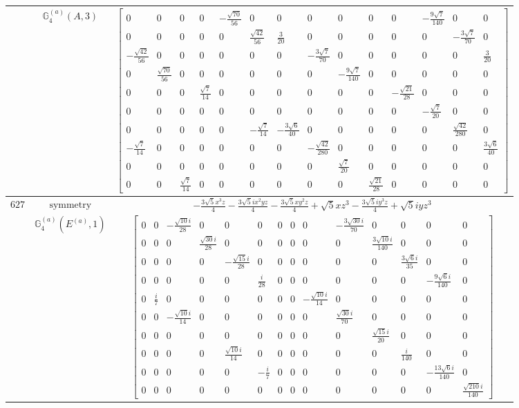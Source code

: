 \documentclass[fleqn,8pt,landscape]{jsarticle}
\begin{document}
\begin{longtable}{ccc}
$  $ & $ \mathbb{G}_{4}^{(a)}(A,3) $ & $ \begin{bmatrix} 0 & 0 & 0 & 0 & - \frac{\sqrt{70}}{56} & 0 & 0 & 0 & 0 & 0 & 0 & - \frac{9 \sqrt{7}}{140} & 0 & 0 \\ 0 & 0 & 0 & 0 & 0 & \frac{\sqrt{42}}{56} & \frac{3}{20} & 0 & 0 & 0 & 0 & 0 & - \frac{3 \sqrt{7}}{70} & 0 \\ - \frac{\sqrt{42}}{56} & 0 & 0 & 0 & 0 & 0 & 0 & - \frac{3 \sqrt{7}}{70} & 0 & 0 & 0 & 0 & 0 & \frac{3}{20} \\ 0 & \frac{\sqrt{70}}{56} & 0 & 0 & 0 & 0 & 0 & 0 & - \frac{9 \sqrt{7}}{140} & 0 & 0 & 0 & 0 & 0 \\ 0 & 0 & 0 & \frac{\sqrt{7}}{14} & 0 & 0 & 0 & 0 & 0 & 0 & - \frac{\sqrt{21}}{28} & 0 & 0 & 0 \\ 0 & 0 & 0 & 0 & 0 & 0 & 0 & 0 & 0 & 0 & 0 & - \frac{\sqrt{7}}{20} & 0 & 0 \\ 0 & 0 & 0 & 0 & 0 & - \frac{\sqrt{7}}{14} & - \frac{3 \sqrt{6}}{40} & 0 & 0 & 0 & 0 & 0 & \frac{\sqrt{42}}{280} & 0 \\ - \frac{\sqrt{7}}{14} & 0 & 0 & 0 & 0 & 0 & 0 & - \frac{\sqrt{42}}{280} & 0 & 0 & 0 & 0 & 0 & \frac{3 \sqrt{6}}{40} \\ 0 & 0 & 0 & 0 & 0 & 0 & 0 & 0 & \frac{\sqrt{7}}{20} & 0 & 0 & 0 & 0 & 0 \\ 0 & 0 & \frac{\sqrt{7}}{14} & 0 & 0 & 0 & 0 & 0 & 0 & \frac{\sqrt{21}}{28} & 0 & 0 & 0 & 0 \end{bmatrix} $ \\ \hline
$ 627 $ & $ \text{symmetry} $ & $ - \frac{3 \sqrt{5} x^{3} z}{4} - \frac{3 \sqrt{5} i x^{2} y z}{4} - \frac{3 \sqrt{5} x y^{2} z}{4} + \sqrt{5} x z^{3} - \frac{3 \sqrt{5} i y^{3} z}{4} + \sqrt{5} i y z^{3} $ \\
$  $ & $ \mathbb{G}_{4}^{(a)}(E^{(a)},1) $ & $ \begin{bmatrix} 0 & 0 & - \frac{\sqrt{10} i}{28} & 0 & 0 & 0 & 0 & 0 & 0 & - \frac{3 \sqrt{30} i}{70} & 0 & 0 & 0 & 0 \\ 0 & 0 & 0 & \frac{\sqrt{30} i}{28} & 0 & 0 & 0 & 0 & 0 & 0 & \frac{3 \sqrt{10} i}{140} & 0 & 0 & 0 \\ 0 & 0 & 0 & 0 & - \frac{\sqrt{15} i}{28} & 0 & 0 & 0 & 0 & 0 & 0 & \frac{3 \sqrt{6} i}{35} & 0 & 0 \\ 0 & 0 & 0 & 0 & 0 & \frac{i}{28} & 0 & 0 & 0 & 0 & 0 & 0 & - \frac{9 \sqrt{6} i}{140} & 0 \\ 0 & \frac{i}{7} & 0 & 0 & 0 & 0 & 0 & 0 & - \frac{\sqrt{10} i}{14} & 0 & 0 & 0 & 0 & 0 \\ 0 & 0 & - \frac{\sqrt{10} i}{14} & 0 & 0 & 0 & 0 & 0 & 0 & \frac{\sqrt{30} i}{70} & 0 & 0 & 0 & 0 \\ 0 & 0 & 0 & 0 & 0 & 0 & 0 & 0 & 0 & 0 & \frac{\sqrt{15} i}{20} & 0 & 0 & 0 \\ 0 & 0 & 0 & 0 & \frac{\sqrt{10} i}{14} & 0 & 0 & 0 & 0 & 0 & 0 & \frac{i}{140} & 0 & 0 \\ 0 & 0 & 0 & 0 & 0 & - \frac{i}{7} & 0 & 0 & 0 & 0 & 0 & 0 & - \frac{13 \sqrt{6} i}{140} & 0 \\ 0 & 0 & 0 & 0 & 0 & 0 & 0 & 0 & 0 & 0 & 0 & 0 & 0 & \frac{\sqrt{210} i}{140} \end{bmatrix} $ \\ \hline

\end{longtable}
\end{document}
